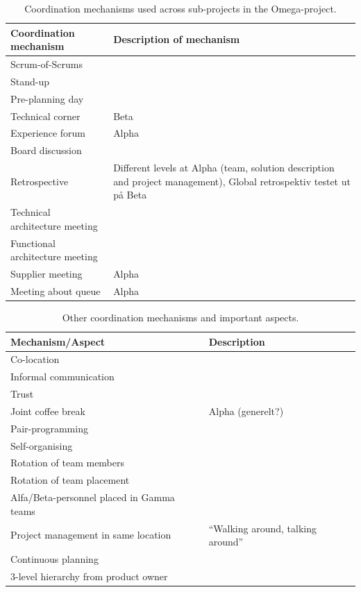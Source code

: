 \begin{table}[H]
\begin{center}
    \begin{tabular}{| p{6cm} | p{9cm} |}
    \hline
    \textbf{Coordination mechanism} & \textbf{Description of mechanism} \\ \hline
    Scrum-of-Scrums & \\ \hline
    Stand-up & \\ \hline
    Pre-planning day & \\ \hline
    Technical corner & Beta \\ \hline
    Experience forum & Alpha \\ \hline
    Board discussion & \\ \hline
    Retrospective & Different levels at Alpha (team, solution description and project management), Global retrospektiv testet ut på Beta \\ \hline
    Technical architecture meeting & \\ \hline
    Functional architecture meeting & \\ \hline
    Supplier meeting & Alpha \\ \hline
    Meeting about queue & Alpha \\ \hline
    \end{tabular}
    \caption{Coordination mechanisms used across sub-projects in the Omega-project.}
    \label{cmuasito}
\end{center}
\end{table}

\begin{table}[H]
\begin{center}
    \begin{tabular}{| p{6cm} | p{9cm} |}
    \hline
    \textbf{Mechanism/Aspect} & \textbf{Description} \\ \hline
    Co-location & \\ \hline
    Informal communication & \\ \hline
    Trust & \\ \hline
    Joint coffee break & Alpha (generelt?) \\ \hline
    Pair-programming & \\ \hline
    Self-organising & \\ \hline
    Rotation of team members & \\ \hline
    Rotation of team placement & \\ \hline
    Alfa/Beta-personnel placed in Gamma teams & \\ \hline
    Project management in same location & ``Walking around, talking around'' \\ \hline
    Continuous planning & \\ \hline
    3-level hierarchy from product owner & \\ \hline
    \end{tabular}
    \caption{Other coordination mechanisms and important aspects.}
    \label{ocmaia}
\end{center}
\end{table}